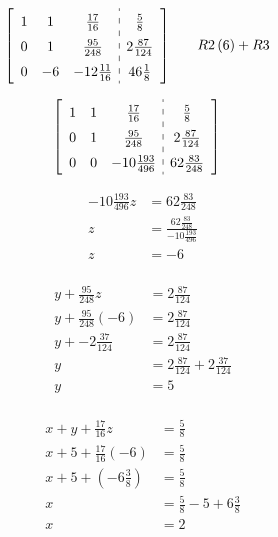 \documentclass[fleqn]{article}
\begin{document}
    \begin{alignat*}{2}
      &\left[\def\arraystretch{1.5}
        \begin{array}{ccc:c}
          1 & 1 & \frac{17}{16} & \frac{5}{8} \\
          0 & 1 & \frac{95}{248} & 2\frac{87}{124} \\
          0 & -6 & -12\frac{11}{16} & 46\frac{1}{8}
        \end{array}
      \right]
      \quad
      && R2\left(6\right)+R3
    \end{alignat*}
  
    \begin{alignat*}{2}
      &\left[\def\arraystretch{1.5}
        \begin{array}{ccc:c}
          1 & 1 & \frac{17}{16} & \frac{5}{8}  \\
          0 & 1 & \frac{95}{248} & 2\frac{87}{124} \\
          0 & 0 & -10\frac{193}{496} & 62\frac{83}{248} \\
        \end{array}
      \right]
    \end{alignat*}
  
    \begin{align*}
      -10\frac{193}{496}z &= 62\frac{83}{248} \\
      z &= \frac{62\frac{83}{248}}{-10\frac{193}{496}} \\
      z &= -6 \\
    \end{align*}

    \begin{align*}
      y + \frac{95}{248}z &= 2\frac{87}{124} \\
      y + \frac{95}{248}(-6) &= 2\frac{87}{124}  \\
      y + -2\frac{37}{124} &= 2\frac{87}{124}  \\
      y &= 2\frac{87}{124} + 2\frac{37}{124} \\
      y &= 5  \\
    \end{align*}

    \begin{align*}
      x + y + \frac{17}{16}z &= \frac{5}{8} \\
      x + 5 + \frac{17}{16}(-6) &= \frac{5}{8}  \\
      x + 5 + (-6\frac{3}{8}) &= \frac{5}{8}  \\
      x &= \frac{5}{8} -5 +6\frac{3}{8}  \\
      x &= 2  \\
    \end{align*}
\end{document}
